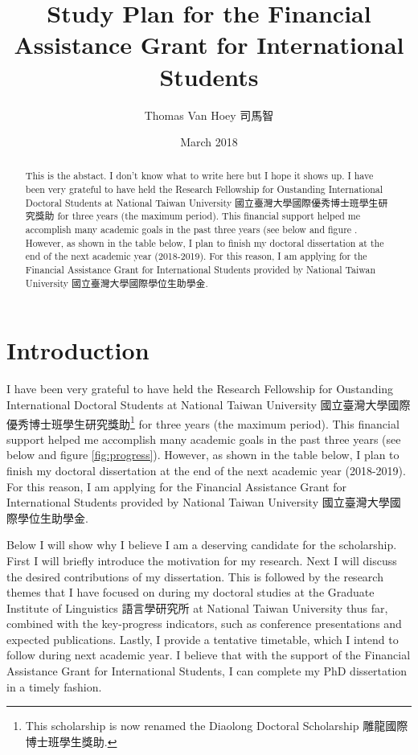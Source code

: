 \documentclass[12pt,]{article}
\title{Study Plan for the Financial Assistance Grant for International Students}
\author{Thomas Van Hoey 司馬智}
\date{March 2018}
\let\rmarkdownfootnote\footnote%
\def\footnote{\protect\rmarkdownfootnote}
\theoremstyle{definition}
\theoremstyle{definition}
\theoremstyle{definition}
\theoremstyle{remark}
\begin{document}
\maketitle
\begin{abstract}
\noindent This is the abstact. I don't know what to write here but I
hope it shows up. I have been very grateful to have held the Research
Fellowship for Oustanding International Doctoral Students at National
Taiwan University 國立臺灣大學國際優秀博士班學生研究獎助 for three years
(the maximum period). This financial support helped me accomplish many
academic goals in the past three years (see below and figure . However,
as shown in the table below, I plan to finish my doctoral dissertation
at the end of the next academic year (2018-2019). For this reason, I am
applying for the Financial Assistance Grant for International Students
provided by National Taiwan University 國立臺灣大學國際學位生助學金.
\end{abstract}

\setlength{\parindent}{0.5cm} %
\setlength{\parskip}{0em} %

\section{Introduction}\label{introduction}

I have been very grateful to have held the Research Fellowship for
Oustanding International Doctoral Students at National Taiwan University
國立臺灣大學國際優秀博士班學生研究獎助\footnote{This scholarship is now
  renamed the Diaolong Doctoral Scholarship 雕龍國際博士班學生獎助.} for
three years (the maximum period). This financial support helped me
accomplish many academic goals in the past three years (see below and
figure \ref{fig:progress}). However, as shown in the table below, I plan
to finish my doctoral dissertation at the end of the next academic year
(2018-2019). For this reason, I am applying for the Financial Assistance
Grant for International Students provided by National Taiwan University
國立臺灣大學國際學位生助學金.

Below I will show why I believe I am a deserving candidate for the
scholarship. First I will briefly introduce the motivation for my
research. Next I will discuss the desired contributions of my
dissertation. This is followed by the research themes that I have
focused on during my doctoral studies at the Graduate Institute of
Linguistics 語言學研究所 at National Taiwan University thus far,
combined with the key-progress indicators, such as conference
presentations and expected publications. Lastly, I provide a tentative
timetable, which I intend to follow during next academic year. I believe
that with the support of the Financial Assistance Grant for
International Students, I can complete my PhD dissertation in a timely
fashion.
\end{document}

